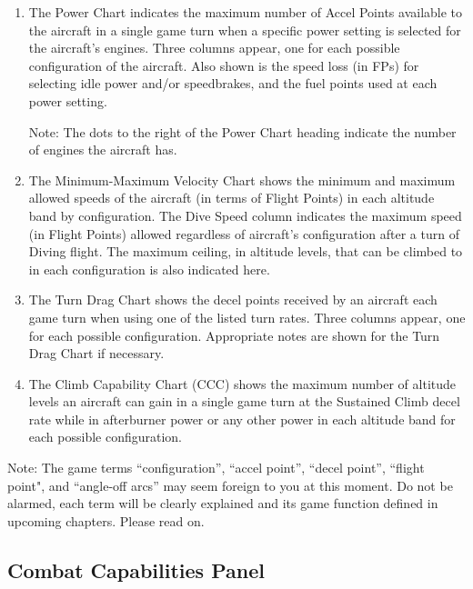 \begin{enumerate}
    \item {} The Power Chart indicates the maximum number of Accel Points available to the aircraft in a single game turn when a specific power setting is selected for the aircraft's engines. Three columns appear, one for each possible configuration of the aircraft. Also shown is the speed loss (in FPs) for selecting idle power and/or speedbrakes, and the fuel points used at each power setting.

    Note: The dots to the right of the Power Chart heading indicate the number of engines the aircraft has.

    \item {} The Minimum-Maximum Velocity Chart shows the minimum and maximum allowed speeds of the aircraft (in terms of Flight Points) in each altitude band by configuration. The Dive Speed column indicates the maximum speed (in Flight Points) allowed regardless of aircraft's configuration after a turn of Diving flight. The maximum ceiling, in altitude levels, that can be climbed to in each configuration is also indicated here.

    \item {} The Turn Drag Chart shows the decel points received by an aircraft each game turn when using one of the listed turn rates. Three columns appear, one for each possible configuration. Appropriate notes are shown for the Turn Drag Chart if necessary.

    \item {} The Climb Capability Chart (CCC) shows the maximum number of altitude levels an aircraft can gain in a single game turn at the Sustained Climb decel rate while in afterburner power or any other power in each altitude band for each possible configuration.

\end{enumerate}

Note: The game terms “configuration”, “accel point”, “decel point”, “flight point", and “angle-off arcs” may seem foreign to you at this moment. Do not be alarmed, each term will be clearly explained and its game function defined in upcoming chapters. Please read on.

\subsection{Combat Capabilities Panel}

